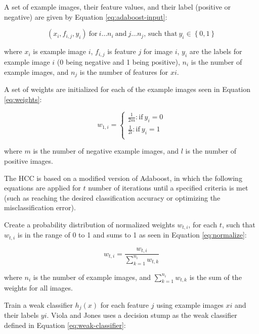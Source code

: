A set of example images, their feature values, and their label (positive or negative) are given by Equation \ref{eq:adaboost-input}: 

\begin{equation} \label{eq:adaboost-input}
(x_i, f_{i, j}, y_i) \ \text{for} \ i \dots n_i \ \text{and} \ j \dots n_j \text{, such that} \ y_i \in \left\{0, 1 \right\}
\end{equation}


where $x_i$ is example image $i$, $f_{i, j}$ is feature $j$ for image $i$, $y_i$ are the labels for example image $i$ (0 being negative and 1 being positive), $n_i$ is the number of example images, and $n_j$ is the number of features for $xi$.

A set of weights are initialized for each of the example images seen in Equation \ref{eq:weights}:

\begin{equation} \label{eq:weights}
w_{1,i} = 
    \begin{cases}
        \frac{1}{2m}: \text{if} \ y_i = 0 \\
        \frac{1}{2l}: \text{if} \ y_i = 1\\
    \end{cases}
\end{equation}

where $m$ is the number of negative example images, and $l$ is the number of positive images.

The HCC is based on a modified version of Adaboost, in which the following equations are applied for $t$ number of iterations until a specified criteria is met (such as reaching the desired classification accuracy or optimizing the misclassification error).

Create a probability distribution of normalized weights $w_{t,i}$, for each $t$, such that $w_{t,i}$ is in the range of 0 to 1 and sums to 1 as seen in Equation \ref{eq:normalize}:

\begin{equation} \label{eq:normalize}
w_{t,i} = \frac{w_{t,i}}{\sum_{k=1}^{n_i}{w_{t,k}}}
\end{equation}
    
where $n_i$ is the number of example images, and $\sum_{k=1}^{n_i}{w_{t,k}}$ is the sum of the weights for all images.

Train a weak classifier $h_j(x)$ for each feature $j$ using example images $xi$ and their labels $yi$. Viola and Jones uses a decision stump as the weak classifier defined in Equation \ref{eq:weak-classifier}:

